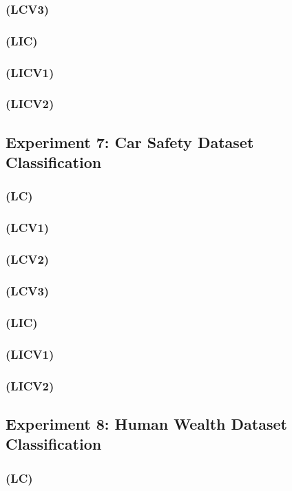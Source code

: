 \documentclass[a4paper, 12pt]{report}
\begin{document}
\subsubsection{(LCV3)}
\subsubsection{(LIC)}
\subsubsection{(LICV1)}
\subsubsection{(LICV2)}

\subsection{Experiment 7: Car Safety Dataset Classification}
\subsubsection{(LC)}
\subsubsection{(LCV1)}
\subsubsection{(LCV2)}
\subsubsection{(LCV3)}
\subsubsection{(LIC)}
\subsubsection{(LICV1)}
\subsubsection{(LICV2)}

\subsection{Experiment 8: Human Wealth Dataset Classification}
\subsubsection{(LC)}
\end{document}
